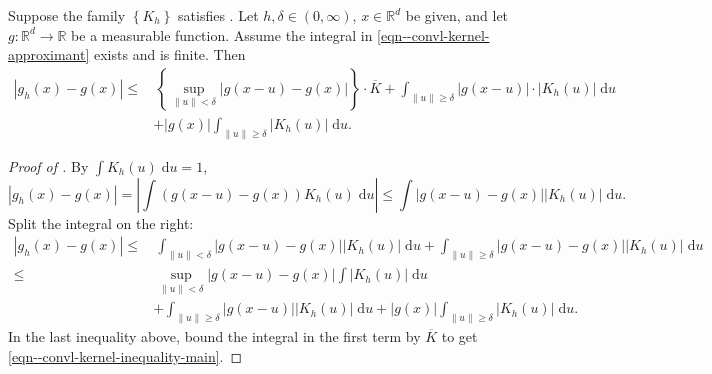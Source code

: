 \begin{theorem}
\label{thm--convl-kernel-point-error-bound}
Suppose the family \(\left\{ K_{h} \right\}\) satisfies
.
Let \(h, \delta \in (0, \infty)\), \(x \in \mathbb{R}^{d}\) be given, and let
\(g : \mathbb{R}^{d} \to \mathbb{R}\) be a measurable function.
Assume the integral in \eqref{eqn--convl-kernel-approximant} exists and is
finite.
Then
\begin{equation}
  \begin{split}
    \left| g_{h} (x) - g (x) \right| \leq
    & \, \left\{ \sup_{\|u\| < \delta} |g (x - u) - g (x)| \right\} \cdot
    \overline{K} + \int_{\|u\| \geq \delta} |g (x - u)| \cdot \left| K_{h} (u)
    \right| \; \mathrm{d} u \\
    & + |g (x)| \int_{\|u\| \geq \delta} \left| K_{h} (u) \right| \; \mathrm{d}
    u.
  \end{split}
  \label{eqn--convl-kernel-inequality-main}
\end{equation}
\end{theorem}

\begin{proof}[Proof of ]
By \(\int K_{h} (u) \; \mathrm{d} u = 1\),
\begin{equation*}
  \left| g_{h} (x) - g (x) \right| = \left| \int (g (x - u) - g (x)) K_{h} (u)
  \; \mathrm{d} u \right| \leq \int |g (x - u) - g (x)| \left| K_{h} (u) \right|
  \; \mathrm{d} u.
\end{equation*}
Split the integral on the right:
\begin{align*}
  \left| g_{h} (x) - g (x) \right| \leq
  & \, \int_{\|u\| < \delta} |g (x - u) - g (x)| \left| K_{h} (u) \right| \;
  \mathrm{d} u %
  + \int_{\|u\| \geq \delta} |g (x - u) - g (x)| \left| K_{h} (u) \right| \;
  \mathrm{d} u \\
  \leq
  & \, \sup_{\|u\| < \delta} |g (x - u) - g (x)| \int \left| K_{h} (u) \right|
  \; \mathrm{d} u \\
  & + \int_{\|u\| \geq \delta} |g (x - u)| \left| K_{h} (u) \right| \;
  \mathrm{d} u + |g (x)| \int_{\|u\| \geq \delta} \left| K_{h} (u) \right| \;
  \mathrm{d} u.
\end{align*}
In the last inequality above, bound the integral in the first term by
\(\overline{K}\) to get \eqref{eqn--convl-kernel-inequality-main}.
\end{proof}

